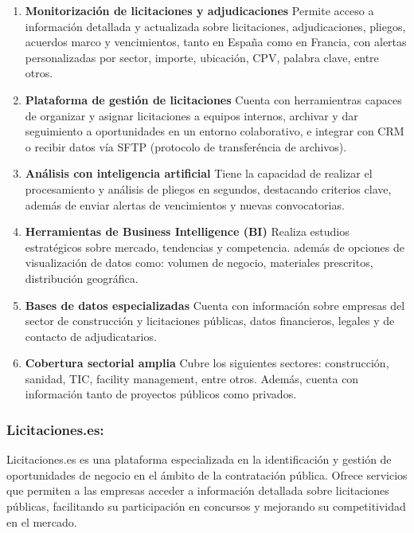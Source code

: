 \documentclass{article}
\begin{document}
\begin{enumerate}
    \item \textbf{Monitorización de licitaciones y adjudicaciones}
    \newline
        Permite acceso a información detallada y actualizada sobre licitaciones, adjudicaciones, pliegos, acuerdos marco y vencimientos, tanto en España como en Francia, con alertas personalizadas por sector, importe, ubicación, CPV, palabra clave, entre otros.
    
    \item \textbf{Plataforma de gestión de licitaciones}
        \newline
        Cuenta con herramientras capaces de organizar y asignar licitaciones a equipos internos, archivar y dar seguimiento a oportunidades en un entorno colaborativo, e integrar con CRM o recibir datos vía SFTP (protocolo de transferéncia de archivos).

    \item \textbf{Análisis con inteligencia artificial}
    \newline
        Tiene la capacidad de realizar el procesamiento y análisis de pliegos en segundos, destacando criterios clave, además de enviar alertas de vencimientos y nuevas convocatorias.

    \item \textbf{Herramientas de Business Intelligence (BI)}
    \newline
        Realiza estudios estratégicos sobre mercado, tendencias y competencia.
        además de opciones de visualización de datos como: volumen de negocio, materiales prescritos, distribución geográfica.

    \item \textbf{Bases de datos especializadas}
    \newline
        Cuenta con información sobre empresas del sector de construcción y licitaciones públicas, datos financieros, legales y de contacto de adjudicatarios.

    \item \textbf{Cobertura sectorial amplia}
    \newline
        Cubre los siguientes sectores: construcción, sanidad, TIC, facility management, entre otros. Además, cuenta con información tanto de proyectos públicos como privados.

\end{enumerate}

  \subsubsection{Licitaciones.es:} 
  Licitaciones.es es una plataforma especializada en la identificación y gestión de oportunidades de negocio en el ámbito de la contratación pública. Ofrece servicios que permiten a las empresas acceder a información detallada sobre licitaciones públicas, facilitando su participación en concursos y mejorando su competitividad en el mercado.
\end{document}
